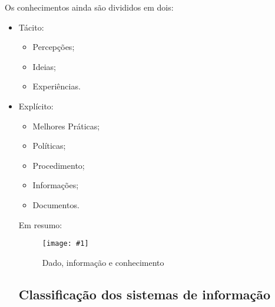 \documentclass[
	12pt,				%
	openany,			%
	a4paper,			%
	chapter=TITLE,		%
	section=TITLE,		%
	english,
	brazil				%
]{abntex2}
\newcommand{\imagem}[3]{
	\begin{figure}[htb]
		\begin{center}
			\texttt{[image: \#1]}
		\end{center}
		\caption{#2}%
	\end{figure}
}
\begin{document}
\begin{itemize}
Os conhecimentos ainda são divididos em dois:
	\begin{itemize}
		\item Tácito:
			\begin{itemize}
				\item Percepções;
				\item Ideias;
				\item Experiências.
			\end{itemize}
		\item Explícito:
			\begin{itemize}
				\item Melhores Práticas;
				\item Políticas;
				\item Procedimento;
				\item Informações;
				\item Documentos.
			\end{itemize}
\newpage
Em resumo:
\imagem{tab_con.png}{Dado, informação e conhecimento}{rótulo_para_referência}

\subsection{Classificação dos sistemas de informação}


\end{itemize}
\end{itemize}
\end{document}
